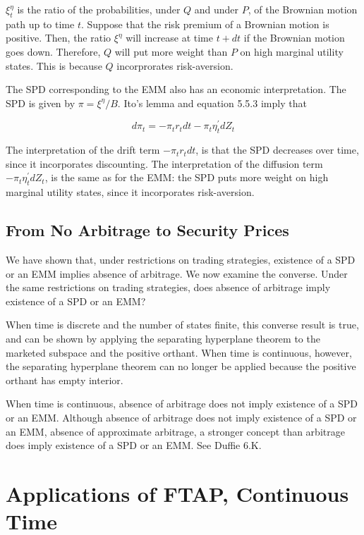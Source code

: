 \documentclass[\topdir/lecture\_notes.tex]{subfiles}
\begin{document}
\(\xi_{t}^{\eta}\) is the ratio of the probabilities, under \(Q\) and under \(P\), of the Brownian motion path up to time \(t\). Suppose that the risk premium of a Brownian motion is positive. Then, the ratio \(\xi^{\eta}\) will increase at time \(t+d t\) if the Brownian motion goes down. Therefore, \(Q\) will put more weight than \(P\) on high marginal utility states. This is because \(Q\) incorprorates risk-aversion.

The SPD corresponding to the EMM also has an economic interpretation. The SPD is given by \(\pi=\xi^{\eta} / B\). Ito's lemma and equation 5.5.3 imply that

\begin{equation*}
d \pi_{t}=-\pi_{t} r_{t} d t-\pi_{t} \eta_{t}^{\prime} d Z_{t}
\end{equation*}

The interpretation of the drift term \(-\pi_{t} r_{t} d t\), is that the SPD decreases over time, since it incorporates discounting. The interpretation of the diffusion term \(-\pi_{t} \eta_{t}^{\prime} d Z_{t}\), is the same as for the EMM: the SPD puts more weight on high marginal utility states, since it incorporates risk-aversion.


\subsection{From No Arbitrage to Security Prices}
We have shown that, under restrictions on trading strategies, existence of a SPD or an EMM implies absence of arbitrage. We now examine the converse. Under the same restrictions on trading strategies, does absence of arbitrage imply existence of a SPD or an EMM?

When time is discrete and the number of states finite, this converse result is true, and can be shown by applying the separating hyperplane theorem to the marketed subspace and the positive orthant. When time is continuous, however, the separating hyperplane theorem can no longer be applied because the positive orthant has empty interior.

When time is continuous, absence of arbitrage does not imply existence of a SPD or an EMM. Although absence of arbitrage does not imply existence of a SPD or an EMM, absence of approximate arbitrage, a stronger concept than arbitrage does imply existence of a SPD or an EMM. See Duffie 6.K.


\section{Applications of FTAP, Continuous Time}
\end{document}
